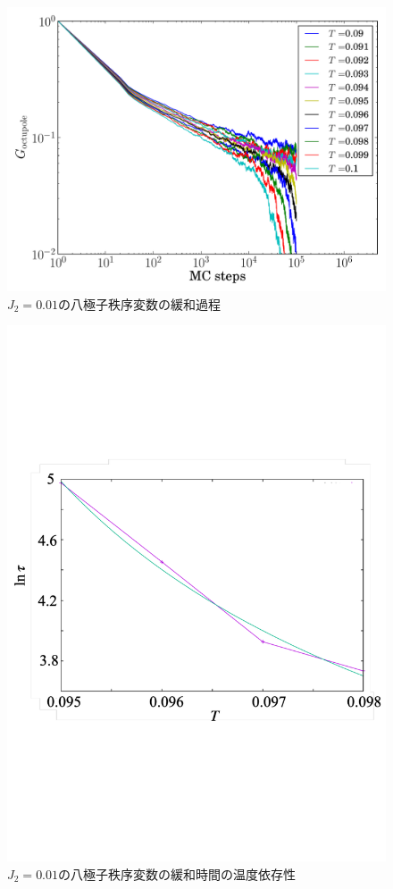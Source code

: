 \documentclass[12pt,titlepage,dvipdfmx]{jarticle}
\begin{document}
\begin{figure}[H]
   \centering
   \includegraphics[width=12cm]{figure/octupole_raw_data_j2_0.01.pdf}
   \caption{$J_2=0.01$の八極子秩序変数の緩和過程}
\end{figure}

\begin{figure}[H]
   \centering
   \includegraphics[width=12cm]{figure/octupole_Tc_j2_0.01.pdf}
   \caption{$J_2=0.01$の八極子秩序変数の緩和時間の温度依存性}
\end{figure}
\end{document}
